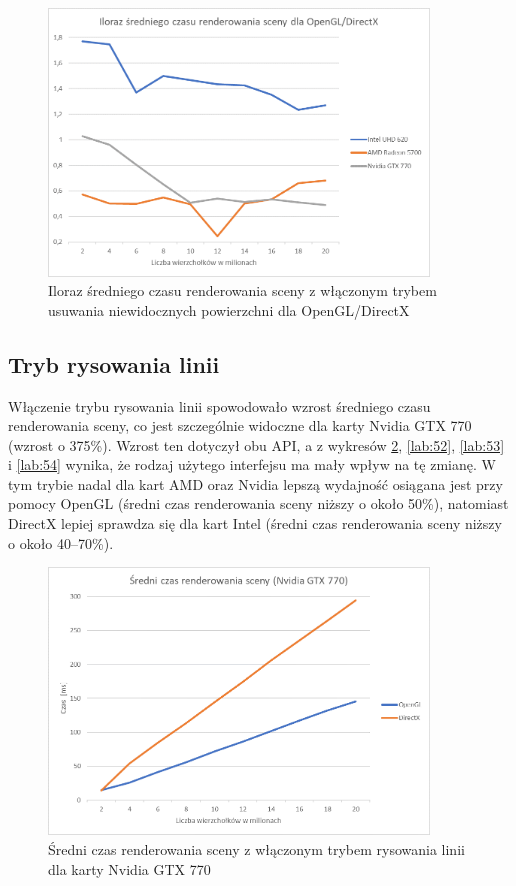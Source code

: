\documentclass[archive]{mgr}
\begin{document}
\begin{figure}[h!]
  \centering
    \includegraphics[width=0.9\textwidth]{images/cull/4.png}
   \caption{Iloraz średniego czasu renderowania sceny z włączonym trybem usuwania niewidocznych powierzchni dla OpenGL/DirectX}
   \label{lab:44}
\end{figure}

\subsection{Tryb rysowania linii}

Włączenie trybu rysowania linii spowodowało wzrost średniego czasu renderowania sceny, co jest szczególnie widoczne dla karty Nvidia GTX 770 (wzrost o 375\%). Wzrost ten dotyczył obu API, a z wykresów \ref{lab:51}, \ref{lab:52}, \ref{lab:53} i \ref{lab:54} wynika, że rodzaj użytego interfejsu ma mały wpływ na tę zmianę. W tym trybie nadal dla kart AMD oraz Nvidia lepszą wydajność osiągana jest przy pomocy OpenGL (średni czas renderowania sceny niższy o około 50\%), natomiast DirectX lepiej sprawdza się dla kart Intel (średni czas renderowania sceny niższy o około 40–70\%).


\begin{figure}[h!]
  \centering
    \includegraphics[width=0.9\textwidth]{images/wire/1.png}
   \caption{Średni czas renderowania sceny z włączonym trybem rysowania linii dla karty Nvidia GTX 770}
   \label{lab:51}
\end{figure}
\newpage
\end{document}
